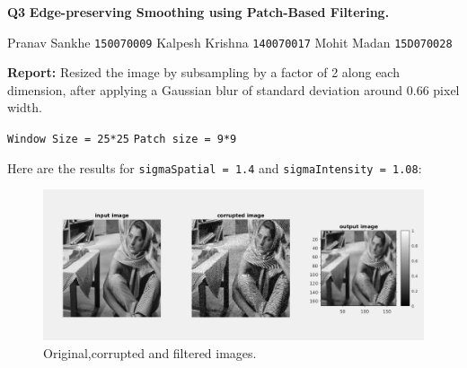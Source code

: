 \documentclass{article}
\begin{document}
\textbf{Q3}  
\textbf{Edge-preserving Smoothing using Patch-Based Filtering.}
\vskip 0.2in

Pranav Sankhe \texttt{150070009} \newline
Kalpesh Krishna \texttt{140070017}  \newline
Mohit Madan \texttt{15D070028} \newline

\vskip 0.5in

\textbf{Report:}  
\vskip 0.1in
Resized the image by subsampling by a factor of 2 along each dimension, after applying a Gaussian blur of standard deviation around 0.66 pixel width. \newline

\texttt{Window Size = 25*25}   \newline
\texttt{Patch size = 9*9}  \newline

Here are the results for \texttt{sigmaSpatial = 1.4} and \texttt{sigmaIntensity = 1.08}: 

\begin{figure}[h!]
  \includegraphics[width=\linewidth]{result.png}
  \caption{Original,corrupted and filtered images.}
  \label{fig:result1}
\end{figure}
\end{document}
